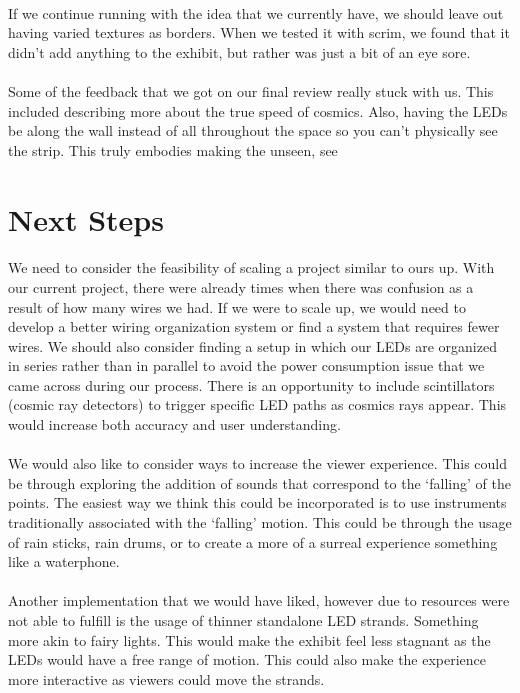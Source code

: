 \documentclass{article}
\begin{document}
\paragraph{}If we continue running with the idea that we currently have, we should leave out having varied textures as borders. When we tested it with scrim, we found that it didn’t add anything to the exhibit, but rather was just a bit of an eye sore. 
\paragraph{}Some of the feedback that we got on our final review really stuck with us. This included describing more about the true speed of cosmics. Also, having the LEDs be along the wall instead of all throughout the space so you can't physically see the strip. This truly embodies making the unseen, see

\section{Next Steps}
\paragraph{}We need to consider the feasibility of scaling a project similar to ours up. With our current project, there were already times when there was confusion as a result of how many wires we had. If we were to scale up, we would need to develop a better wiring organization system or find a system that requires fewer wires. We should also consider finding a setup in which our LEDs are organized in series rather than in parallel to avoid the power consumption issue that we came across during our process. There is an opportunity to include scintillators (cosmic ray detectors) to trigger specific LED paths as cosmics rays appear. This would increase both accuracy and user understanding.
\paragraph{}We would also like to consider ways to increase the viewer experience. This could be through exploring the addition of sounds that correspond to the ‘falling’ of the points. The easiest way we think this could be incorporated is to use instruments traditionally associated with the ‘falling’ motion. This could be through the usage of rain sticks, rain drums, or to create a more of a surreal experience something like a waterphone.
\paragraph{}Another implementation that we would have liked, however due to resources were not able to fulfill is the usage of thinner standalone LED strands. Something more akin to fairy lights. This would make the exhibit feel less stagnant as the LEDs would have a free range of motion. This could also make the experience more interactive as viewers could move the strands. 
\end{document}
